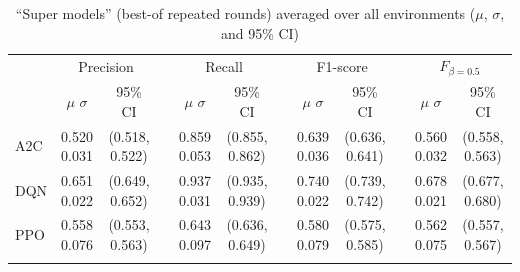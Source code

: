 \documentclass[12pt,oneside]{book}
\renewcommand{\arraystretch}{1.5}
\begin{document}
\begin{table}[htbp]
    \centering
    \caption{``Super models'' (best-of repeated rounds) averaged over all environments ($\mu$, $\sigma$, and 95\% CI)}
    \label{tab:a2-supermodels}
    \setlength{\tabcolsep}{5pt}
    {\renewcommand{\arraystretch}{1.2}
    \begin{tabular}{@{}l cc c cc c cc c cc@{}}
        \arrayrulecolor{black!40}\toprule
        & \multicolumn{2}{c}{Precision} &  & \multicolumn{2}{c}{Recall} & & \multicolumn{2}{c}{F1-score} &  & \multicolumn{2}{c}{$F_{\beta=0.5}$} \\
        \cmidrule{2-3} \cmidrule{5-6} \cmidrule{8-9} \cmidrule{11-12}
        & \makecell{$\mu$ \\ $\sigma$} & 95\% CI & & \makecell{$\mu$ \\ $\sigma$} & 95\% CI & & \makecell{$\mu$ \\ $\sigma$} & 95\% CI & & \makecell{$\mu$ \\ $\sigma$} & 95\% CI \\ \midrule
        A2C & \makecell{0.520 \\ 0.031} & \makecell{(0.518,\\0.522)} & & \makecell{0.859 \\ 0.053} & \makecell{(0.855,\\0.862)} & & \makecell{0.639 \\ 0.036} & \makecell{(0.636,\\0.641)} & & \makecell{0.560 \\ 0.032} & \makecell{(0.558,\\0.563)} \\  \arrayrulecolor{gray!30}\midrule
        DQN & \makecell{0.651 \\ 0.022} & \makecell{(0.649,\\0.652)} & & \makecell{0.937 \\ 0.031} & \makecell{(0.935,\\0.939)} & & \makecell{0.740 \\ 0.022} & \makecell{(0.739,\\0.742)} & & \makecell{0.678 \\ 0.021} & \makecell{(0.677,\\0.680)} \\ \arrayrulecolor{gray!30}\midrule
        PPO & \makecell{0.558 \\ 0.076} & \makecell{(0.553,\\0.563)} & & \makecell{0.643 \\ 0.097} & \makecell{(0.636,\\0.649)} & & \makecell{0.580 \\ 0.079} & \makecell{(0.575,\\0.585)} & & \makecell{0.562 \\ 0.075} & \makecell{(0.557,\\0.567)} \\  \arrayrulecolor{gray!30}\midrule

\end{tabular}}
\end{table}
\end{document}
